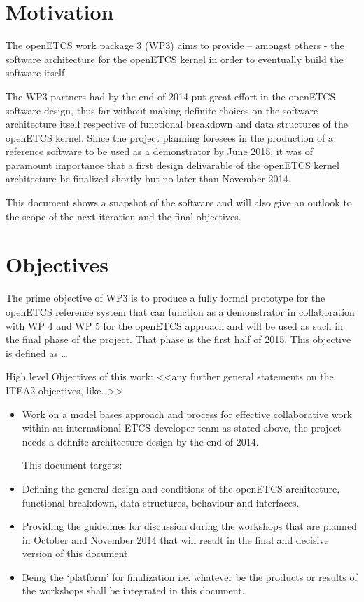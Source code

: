 
\section{Motivation}
The openETCS work package 3 (WP3) aims to provide – amongst others - the software architecture for the openETCS kernel in order to eventually build the software itself. 

The WP3  partners had by the end of 2014 put great effort in the openETCS software design, thus far without making definite choices on the software architecture itself respective of functional breakdown and data structures of the openETCS kernel. Since the project planning foresees in the production of a reference software to be used as a demonstrator by June 2015, it was of paramount importance that a first design delivarable of the openETCS kernel architecture be finalized shortly but no later than November 2014.

This document shows a snapshot of the software and will also give an outlook to the scope of the next iteration and the final objectives.


\section{Objectives}
The prime objective of WP3 is to produce a fully formal prototype for the openETCS reference system that can function as a demonstrator in collaboration with WP 4 and WP 5  for the openETCS approach and will be used as such in the final phase of the project. That phase is the first half of 2015.  This objective is defined as … 

High level Objectives of this work:
<<any further general statements on the ITEA2  objectives, like…>>

\begin{itemize}
\item Work on a model bases approach and process for effective collaborative work within an international ETCS developer team as stated above, the project needs a definite architecture design by the end of 2014.

This document targets:
\item Defining the general design and conditions of the openETCS architecture, functional breakdown, data structures, behaviour and interfaces.
\item Providing the guidelines for discussion during the workshops that are planned in October and November 2014 that will result in the final and decisive version of this document
\item Being the ‘platform’ for finalization i.e. whatever be the products or results of the workshops shall be integrated in this document.
\end{itemize}

